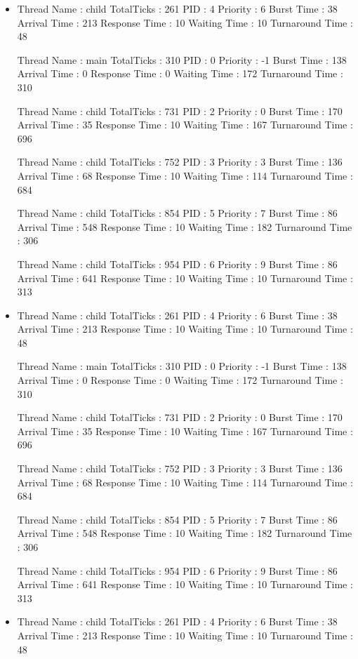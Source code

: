 \documentclass{article}
\begin{document}
\begin{itemize}
\item
Thread Name : child
TotalTicks : 261
PID : 4
Priority : 6
Burst Time : 38
Arrival Time : 213
Response Time : 10
Waiting Time : 10
Turnaround Time : 48

Thread Name : main
TotalTicks : 310
PID : 0
Priority : -1
Burst Time : 138
Arrival Time : 0
Response Time : 0
Waiting Time : 172
Turnaround Time : 310

Thread Name : child
TotalTicks : 731
PID : 2
Priority : 0
Burst Time : 170
Arrival Time : 35
Response Time : 10
Waiting Time : 167
Turnaround Time : 696

Thread Name : child
TotalTicks : 752
PID : 3
Priority : 3
Burst Time : 136
Arrival Time : 68
Response Time : 10
Waiting Time : 114
Turnaround Time : 684

Thread Name : child
TotalTicks : 854
PID : 5
Priority : 7
Burst Time : 86
Arrival Time : 548
Response Time : 10
Waiting Time : 182
Turnaround Time : 306

Thread Name : child
TotalTicks : 954
PID : 6
Priority : 9
Burst Time : 86
Arrival Time : 641
Response Time : 10
Waiting Time : 10
Turnaround Time : 313

\item
Thread Name : child
TotalTicks : 261
PID : 4
Priority : 6
Burst Time : 38
Arrival Time : 213
Response Time : 10
Waiting Time : 10
Turnaround Time : 48

Thread Name : main
TotalTicks : 310
PID : 0
Priority : -1
Burst Time : 138
Arrival Time : 0
Response Time : 0
Waiting Time : 172
Turnaround Time : 310

Thread Name : child
TotalTicks : 731
PID : 2
Priority : 0
Burst Time : 170
Arrival Time : 35
Response Time : 10
Waiting Time : 167
Turnaround Time : 696

Thread Name : child
TotalTicks : 752
PID : 3
Priority : 3
Burst Time : 136
Arrival Time : 68
Response Time : 10
Waiting Time : 114
Turnaround Time : 684

Thread Name : child
TotalTicks : 854
PID : 5
Priority : 7
Burst Time : 86
Arrival Time : 548
Response Time : 10
Waiting Time : 182
Turnaround Time : 306

Thread Name : child
TotalTicks : 954
PID : 6
Priority : 9
Burst Time : 86
Arrival Time : 641
Response Time : 10
Waiting Time : 10
Turnaround Time : 313

\item
Thread Name : child
TotalTicks : 261
PID : 4
Priority : 6
Burst Time : 38
Arrival Time : 213
Response Time : 10
Waiting Time : 10
Turnaround Time : 48


\end{itemize}
\end{document}

